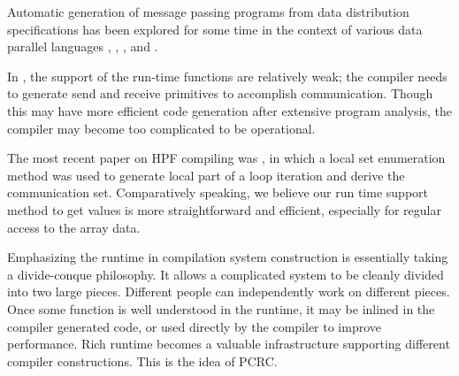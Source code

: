 Automatic generation of message passing programs from data distribution
specifications has been explored for some time in the context of
various data parallel languages \cite{Cal88}, \cite{Rog89},
\cite{Koe91}, \cite{Tes93} and \cite{Hir94}.

In \cite{Tes93}, the support of the run-time functions are relatively
weak; the compiler needs to generate send and receive primitives to
accomplish communication.  Though this may have more efficient code
generation after extensive program analysis, the compiler may become
too complicated to be operational.

The most recent paper on HPF compiling was \cite{Ree96}, in which a
local set enumeration method was used to generate local part of a loop
iteration and derive the communication set.
Comparatively speaking, we believe our run time support method to get
values is more straightforward and efficient, especially for
regular access to the array data.

Emphasizing the runtime in compilation system construction is
essentially taking a divide-conque philosophy.  It allows a complicated
system to be cleanly divided into two large pieces.  Different people
can independently work on different pieces.  Once some function is well
understood in the runtime, it may be inlined in the compiler generated
code, or used directly by the compiler to improve performance.  Rich
runtime becomes a valuable infrastructure supporting different compiler
constructions.  This is the idea of PCRC.

